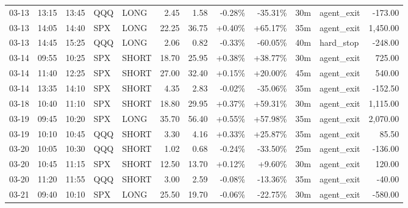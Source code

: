 \documentclass[11pt,a4paper,twoside]{article}
\begin{document}
\begin{center}
\begin{longtable}{>{\color{txtmain}}l l l l l r r r r r >{\color{txtmain}}l r}
03-13 & 13:15 & 13:45 & QQQ & LONG & 2.45 & 1.58 & \textcolor{lossred}{-0.28\%} & \textcolor{lossred}{-35.31\%} & 30m & agent\_exit & \textcolor{lossred}{-173.00} \\
03-13 & 14:05 & 14:40 & SPX & LONG & 22.25 & 36.75 & \textcolor{wingreen}{+0.40\%} & \textcolor{wingreen}{+65.17\%} & 35m & agent\_exit & \textcolor{wingreen}{1,450.00} \\
03-13 & 14:45 & 15:25 & QQQ & LONG & 2.06 & 0.82 & \textcolor{lossred}{-0.33\%} & \textcolor{lossred}{-60.05\%} & 40m & hard\_stop & \textcolor{lossred}{-248.00} \\
03-14 & 09:55 & 10:25 & SPX & SHORT & 18.70 & 25.95 & \textcolor{wingreen}{+0.38\%} & \textcolor{wingreen}{+38.77\%} & 30m & agent\_exit & \textcolor{wingreen}{725.00} \\
03-14 & 11:40 & 12:25 & SPX & SHORT & 27.00 & 32.40 & \textcolor{wingreen}{+0.15\%} & \textcolor{wingreen}{+20.00\%} & 45m & agent\_exit & \textcolor{wingreen}{540.00} \\
03-14 & 13:35 & 14:10 & SPX & SHORT & 4.35 & 2.83 & \textcolor{lossred}{-0.02\%} & \textcolor{lossred}{-35.06\%} & 35m & agent\_exit & \textcolor{lossred}{-152.50} \\
03-18 & 10:40 & 11:10 & SPX & SHORT & 18.80 & 29.95 & \textcolor{wingreen}{+0.37\%} & \textcolor{wingreen}{+59.31\%} & 30m & agent\_exit & \textcolor{wingreen}{1,115.00} \\
03-19 & 09:45 & 10:20 & SPX & LONG & 35.70 & 56.40 & \textcolor{wingreen}{+0.55\%} & \textcolor{wingreen}{+57.98\%} & 35m & agent\_exit & \textcolor{wingreen}{2,070.00} \\
03-19 & 10:10 & 10:45 & QQQ & SHORT & 3.30 & 4.16 & \textcolor{wingreen}{+0.33\%} & \textcolor{wingreen}{+25.87\%} & 35m & agent\_exit & \textcolor{wingreen}{85.50} \\
03-20 & 10:05 & 10:30 & QQQ & SHORT & 1.02 & 0.68 & \textcolor{lossred}{-0.24\%} & \textcolor{lossred}{-33.50\%} & 25m & agent\_exit & \textcolor{lossred}{-136.00} \\
03-20 & 10:45 & 11:15 & SPX & SHORT & 12.50 & 13.70 & \textcolor{wingreen}{+0.12\%} & \textcolor{wingreen}{+9.60\%} & 30m & agent\_exit & \textcolor{wingreen}{120.00} \\
03-20 & 11:20 & 11:55 & QQQ & SHORT & 3.00 & 2.59 & \textcolor{lossred}{-0.08\%} & \textcolor{lossred}{-13.36\%} & 35m & agent\_exit & \textcolor{lossred}{-40.00} \\
03-21 & 09:40 & 10:10 & SPX & LONG & 25.50 & 19.70 & \textcolor{lossred}{-0.06\%} & \textcolor{lossred}{-22.75\%} & 30m & agent\_exit & \textcolor{lossred}{-580.00} \\

\end{longtable}
\end{center}
\end{document}
